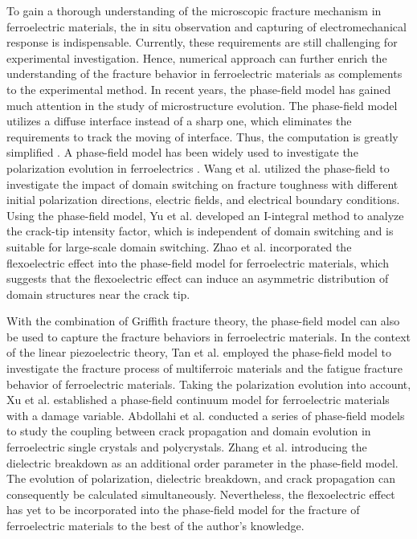 To gain a thorough understanding of the microscopic fracture mechanism in ferroelectric materials, the in situ observation and capturing of electromechanical response is indispensable. Currently, these requirements are still challenging for experimental investigation. Hence, numerical approach can further enrich the understanding of the fracture behavior in ferroelectric materials as complements to the experimental method. In recent years, the phase-field model has gained much attention in the study of microstructure evolution. The phase-field model utilizes a diffuse interface instead of a sharp one, which eliminates the requirements to track the moving of interface. Thus, the computation is greatly simplified \cite{chen_phase-field_2002}. A phase-field model has been widely used to investigate the polarization evolution in ferroelectrics \cite{wang_phase-field_2004,su_continuum_2007,hong_stability_2017,yuan_defect-mediated_2018}. Wang et al. \cite{wang_phase_2007,wang_phase_2008,wang_three-dimensional_2009,wang_effect_2010} utilized the phase-field to investigate the impact of domain switching on fracture toughness with different initial polarization directions, electric fields, and electrical boundary conditions. Using the phase-field model, Yu \cite{yu_i-integral_2016} et al. developed an I-integral method to analyze the crack-tip intensity factor, which is independent of domain switching and is suitable for large-scale domain switching. Zhao et al. \cite{zhao_effect_2018} incorporated the flexoelectric effect into the phase-field model for ferroelectric materials, which suggests that the flexoelectric effect can induce an asymmetric distribution of domain structures near the crack tip.

With the combination of Griffith fracture theory, the phase-field model can also be used to capture the fracture behaviors in ferroelectric materials. In the context of the linear piezoelectric theory, Tan et al. \cite{tan_phase_2023,tan_phase_2022} employed the phase-field model to investigate the fracture process of multiferroic materials  and the fatigue fracture behavior of ferroelectric materials. Taking the polarization evolution into account, Xu et al. \cite{xu_fracture_2010} established a phase-field continuum model for ferroelectric materials with a damage variable. Abdollahi et al. \cite{abdollahi_phase-field_2011,abdollahi_phase-field_2011-1,abdollahi_phase-field_2012,abdollahi_three-dimensional_2014} conducted a series of phase-field models to study the coupling between crack propagation and domain evolution in ferroelectric single crystals and polycrystals. Zhang et al. \cite{yong_zhang_phase_2022,zhang_jumping_2022} introducing the dielectric breakdown as an additional order parameter in the phase-field model. The evolution of polarization, dielectric breakdown, and crack propagation can consequently be calculated simultaneously. Nevertheless, the flexoelectric effect has yet to be incorporated into the phase-field model for the fracture of ferroelectric materials to the best of the author's knowledge.

